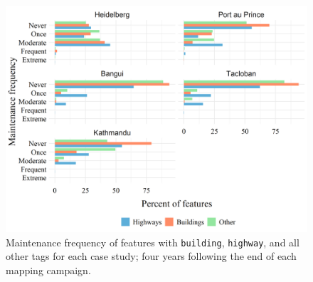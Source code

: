 \begin{figure} %
    \centering %
    \includegraphics[width = \textwidth]{Images/featmaint.png} %
    \caption[Maintenance frequency of features with \texttt{building}, \texttt{highway}, and all other tags for each case study.]{Maintenance frequency of features with \texttt{building}, \texttt{highway}, and all other tags for each case study; four years following the end of each mapping campaign.} %
    \label{fig:feats} %
\end{figure}

